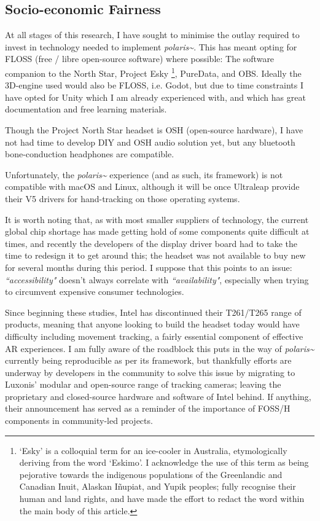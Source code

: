 \subsection{Socio-economic Fairness}\label{sec: polaris-ethics-}
At all stages of this research, I have sought to minimise the outlay required to invest in technology needed to implement \textit{polaris\textasciitilde{}}. This has meant opting for FLOSS (free / libre open-source software) where possible: The software companion to the North Star, Project Esky \footnote{`Esky' is a colloquial term for an ice-cooler in Australia, etymologically deriving from the word ‘Eskimo’. I acknowledge the use of this term as being pejorative towards the indigenous populations of the Greenlandic and Canadian Inuit, Alaskan Iñupiat, and Yupik peoples; fully recognise their human and land rights, and have made the effort to redact the word within the main body of this article.}, PureData, and OBS. Ideally the 3D-engine used would also be FLOSS, i.e. Godot, but due to time constraints I have opted for Unity which I am already experienced with, and which has great documentation and free learning materials.

Though the Project North Star headset is OSH (open-source hardware), I have not had time to develop DIY and OSH audio solution yet, but any bluetooth bone-conduction headphones are compatible.

Unfortunately, the \textit{polaris\textasciitilde{}} experience (and as such, its framework) is not compatible with macOS and Linux, although it will be once Ultraleap provide their V5 drivers for hand-tracking on those operating systems.

It is worth noting that, as with most smaller suppliers of technology, the current global chip shortage has made getting hold of some components quite difficult at times, and recently the developers of the display driver board had to take the time to redesign it to get around this; the headset was not available to buy new for several months during this period. I suppose that this points to an issue: \textit{``accessibility"} doesn’t always correlate with \textit{``availability"}, especially when trying to circumvent expensive consumer technologies.

Since beginning these studies, Intel has discontinued their T261/T265 range of products, meaning that anyone looking to build the headset today would have difficulty including movement tracking, a fairly essential component of effective AR experiences. I am fully aware of the roadblock this puts in the way of \textit{polaris\textasciitilde{}} currently being reproducible as per its framework, but thankfully efforts are underway by developers in the community to solve this issue by migrating to Luxonis’ modular and open-source range of tracking cameras; leaving the proprietary and closed-source hardware and software of Intel behind. If anything, their announcement has served as a reminder of the importance of FOSS/H components in community-led projects.

